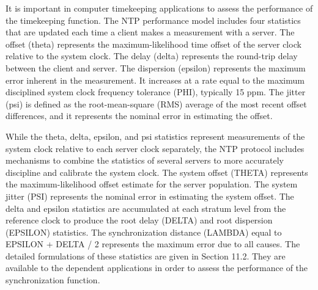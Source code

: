 It is important in computer timekeeping applications to assess the
performance of the timekeeping function. The NTP performance model
includes four statistics that are updated each time a client makes a
measurement with a server. The offset (theta) represents the
maximum-likelihood time offset of the server clock relative to the
system clock. The delay (delta) represents the round-trip delay
between the client and server. The dispersion (epsilon) represents
the maximum error inherent in the measurement. It increases at a
rate equal to the maximum disciplined system clock frequency
tolerance (PHI), typically 15 ppm. The jitter (psi) is defined as
the root-mean-square (RMS) average of the most recent offset
differences, and it represents the nominal error in estimating the
offset.

While the theta, delta, epsilon, and psi statistics represent
measurements of the system clock relative to each server clock
separately, the NTP protocol includes mechanisms to combine the
statistics of several servers to more accurately discipline and
calibrate the system clock. The system offset (THETA) represents the
maximum-likelihood offset estimate for the server population. The
system jitter (PSI) represents the nominal error in estimating the
system offset. The delta and epsilon statistics are accumulated at
each stratum level from the reference clock to produce the root delay
(DELTA) and root dispersion (EPSILON) statistics. The
synchronization distance (LAMBDA) equal to EPSILON + DELTA / 2
represents the maximum error due to all causes. The detailed
formulations of these statistics are given in Section 11.2. They are
available to the dependent applications in order to assess the
performance of the synchronization function.
